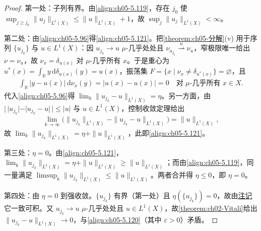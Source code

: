 \documentclass[../../main.tex]{subfiles}
\begin{document}
\begin{proof}
第一处：子列有界。由\eqref{align:ch05-5.119}，存在 $j_0$ 使 $\sup_{j\geqslant j_0}\|u_j\|_{L^1(X)}\leqslant\|u\|_{L^1(X)}+1$，故 $\sup_j\|u_j\|_{L^1(X)}<\infty$。

第二处：由\eqref{align:ch05-5.96}得\eqref{align:ch05-5.121}。把\cref{theorem:ch05-分解}(v) 用于序列 $\{u_{j_k}\}$ 与 $u\in L^1(X)$：因 $u_{j_k}\to u$ $\mu$-几乎处处且 $\nu_{u_{j_k}}\stackrel{n}{\rightharpoonup}\nu_u$，窄极限唯一给出 $\nu=\nu_u$，故 $\nu_x=\delta_{u(x)}$ 对 $\mu$-几乎所有 $x$。于是重心为 $u^*(x)=\int_{\mathbb{R}}y\,\mathrm{d}\delta_{u(x)}(y)=u(x)$，振荡集 $F=\{x\mid\nu_x\neq\delta_{u^*(x)}\}=\varnothing$，且
\begin{align*}
\int_{\mathbb{R}}|y-u(x)|\,\mathrm{d}\nu_x(y)=|u(x)-u(x)|=0
\quad\text{对 }\mu\text{-几乎所有 }x\in X.
\end{align*}
代入\eqref{align:ch05-5.96}得 $\lim_k\|u_{j_k}-u\|_{L^1(X)}=\eta$。另一方面，由 $|\,|u_{j_k}|-|u_{j_k}-u|\,|\leqslant|u|$ 与 $u\in L^1(X)$，控制收敛定理给出
\begin{align*}
\lim_{k\to\infty}\big(\|u_{j_k}\|_{L^1(X)}-\|u_{j_k}-u\|_{L^1(X)}\big)=\|u\|_{L^1(X)},
\end{align*}
故 $\lim_k\|u_{j_k}\|_{L^1(X)}=\eta+\|u\|_{L^1(X)}$，此即\eqref{align:ch05-5.121}。

第三处：$\eta=0$。由\eqref{align:ch05-5.121}，$\lim_k\|u_{j_k}\|_{L^1(X)}=\eta+\|u\|_{L^1(X)}\geqslant\|u\|_{L^1(X)}$；而由\eqref{align:ch05-5.119}，同一量满足 $\limsup_k\|u_{j_k}\|_{L^1(X)}\leqslant\|u\|_{L^1(X)}$。两者合并得 $\eta\leqslant0$，即 $\eta=0$。

第四处：由 $\eta=0$ 到强收敛。$\{u_{j_k}\}$ 有界（第一处）且 $\eta(\{u_{j_k}\})=0$，故由\hyperref[remark:ch02-模零一致可积]{注记}它一致可积。又 $u_{j_k}\to u$ $\mu$-几乎处处且 $u\in L^1(X)$，故\cref{theorem:ch02-Vitali}给出 $\|u_{j_k}-u\|_{L^1(X)}\to0$，与\eqref{align:ch05-5.120}（其中 $\varepsilon>0$）矛盾。
\end{proof}
\end{document}
